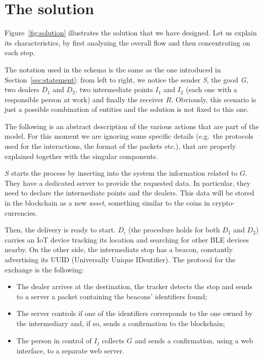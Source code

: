 \chapter{The solution}
\label{cha:main}

Figure~\ref{fig:solution} illustrates the solution that we have designed. Let us explain its characteristics, by first analyzing the overall flow and then concentrating on each step.

The notation used in the schema is the same as the one introduced in Section~\ref{sec:statement}: from left to right, we notice the sender \textit{S}, the good \textit{G}, two dealers $D_1$ and $D_2$, two intermediate points $I_1$ and $I_2$ (each one with a responsible person at work) and finally the receiver $R$. Obviously, this scenario is just a possible combination of entities and the solution is not fixed to this one.

The following is an abstract description of the various actions that are part of the model. For this moment we are ignoring some specific details (e.g.\ the protocols used for the interactions, the format of the packets etc.), that are properly explained together with the singular components.

$S$ starts the process by inserting into the system the information related to $G$. They have a dedicated server to provide the requested data. In particular, they need to declare the intermediate points and the dealers. This data will be stored in the blockchain as a new \emph{asset}, something similar to the coins in crypto-currencies. 

Then, the delivery is ready to start. $D_i$ (the procedure holds for both $D_1$ and $D_2$) carries an IoT device tracking its location and searching for other BLE devices nearby. On the other side, the intermediate stop has a beacon, constantly advertising its UUID (Universally Unique IDentifier). The protocol for the exchange is the following: 
\begin{itemize}
    \item The dealer arrives at the destination, the tracker detects the stop and sends to a server a packet containing the beacons' identifiers found;
    \item The server controls if one of the identifiers corresponds to the one owned by the intermediary and, if so, sends a confirmation to the blockchain;
    \item The person in control of $I_j$ collects $G$ and sends a confirmation, using a web interface, to a separate web server.
\end{itemize}

